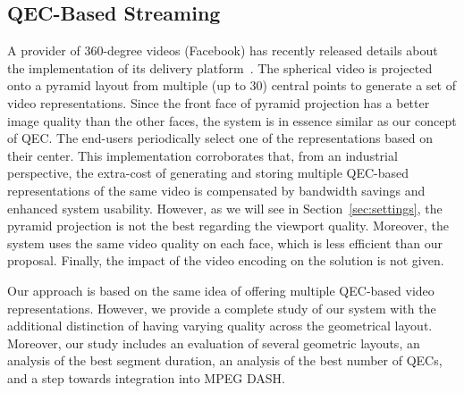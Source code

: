 \subsection{QEC-Based Streaming}

A  provider of $360$-degree videos (Facebook) has recently
released details about the implementation of its delivery
platform~\cite{facebook}.
The spherical video is projected onto a pyramid layout from multiple
(up to $30$) central points to generate a set of video representations.
Since the
front face of pyramid projection has a better image quality than the other faces, the
system is in essence similar as our concept of \ac{QEC}. The end-users
periodically select one of the representations
based on their \FoV{} center. This implementation
corroborates that, from an industrial perspective, the extra-cost of
generating and storing multiple \ac{QEC}-based representations of the
same video is compensated by bandwidth savings and
enhanced system usability.
However, as we will see in Section~\ref{sec:settings}, the pyramid projection is not
the best regarding the viewport quality. Moreover, the system
uses the same video quality on each face, which is less
efficient than our proposal. Finally, the impact of the video encoding on the solution
is not given.

Our approach is based on the same
idea of offering multiple \ac{QEC}-based video representations.
However, we provide a complete study of our system with the additional
distinction of having varying quality across the geometrical layout. Moreover,
our study includes an evaluation of several
geometric layouts, an analysis of the best segment duration, an
analysis of the best number of \acp{QEC},
and a step towards integration into MPEG \ac{DASH}.
